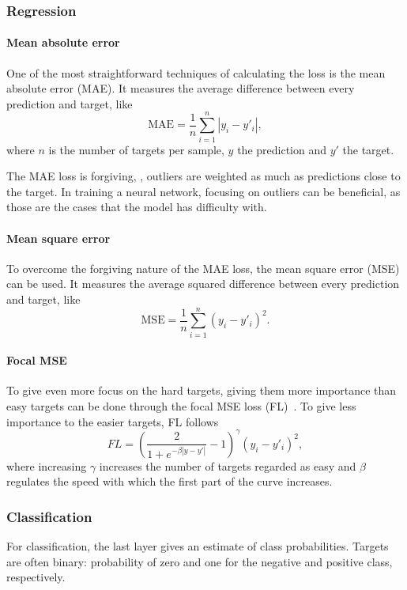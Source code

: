 \subsubsection{Regression}

\paragraph{Mean absolute error}
One of the most straightforward techniques of calculating the loss is the mean absolute error (MAE).
It measures the average difference between every prediction and target, like
\begin{equation}
    \mathrm{MAE} = \frac{1}{n} \sum_{i=1}^{n} |y_i - y'_i|,
\end{equation}
where $n$ is the number of targets per sample, $y$ the prediction and $y'$ the target.

The MAE loss is forgiving, \ie, outliers are weighted as much as predictions close to the target.
In training a neural network, focusing on outliers can be beneficial, as those are the cases that the model has difficulty with.

\paragraph{Mean square error}
To overcome the forgiving nature of the MAE loss, the mean square error (MSE) can be used.
It measures the average squared difference between every prediction and target, like
\begin{equation}
    \mathrm{MSE} = \frac{1}{n} \sum_{i=1}^n (y_i - y'_i)^2.
\end{equation}

\paragraph{Focal MSE}
To give even more focus on the hard targets, giving them more importance than easy targets can be done through the focal MSE loss (FL)~.
To give less importance to the easier targets, FL follows
\begin{equation}
    FL = \left(\frac{2}{1 + e^{-\beta |y - y'|}} - 1 \right)^\gamma (y_i - y'_i)^2,
\end{equation}
where increasing $\gamma$ increases the number of targets regarded as easy and $\beta$ regulates the speed with which the first part of the curve increases.

\subsubsection{Classification}
For classification, the last layer gives an estimate of class probabilities.
Targets are often binary: probability of zero and one for the negative and positive class, respectively.

